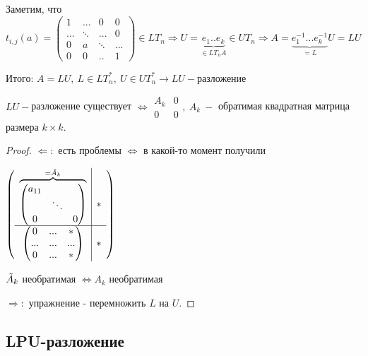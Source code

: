 Заметим, что $t_{i,j}(a)=\begin{pmatrix}
                             1 & ... & 0 & 0 \\
                             ... & \ddots & ... & 0 \\
                             0 & a & \ddots & ... \\
                             0 & 0 & ..& 1
\end{pmatrix}\in LT_n\Rightarrow U=\underbrace{e_1..e_k}_{\in LT_nA}\in UT_n\Rightarrow A = \underbrace{e_1^{-1}...e_k^{-1}}_{= L} U=LU$

Итого: $A=LU,\ L\in LT^*_n,\ U\in UT^*_n\rightarrow LU-$разложение

\begin{statement}
    $LU-$разложение существует $\Leftrightarrow\begin{array}{c|c}
                                                   A_k
                                                   & 0\\\hline 0 & 0\end{array},\ A_k\ -$ обратимая квадратная матрица размера $k\times k$.
\end{statement}

\begin{proof}
    $\Leftarrow:$ есть проблемы $\Leftrightarrow$ в какой-то момент получили

    $\left(\begin{array}{c|c}\overbrace{
        \begin{pmatrix}
            a_{11} & & \\
            & \ddots & \\
            0 && 0
        \end{pmatrix}}^{=\Tilde{A}_k}
    & *\\\hline \begin{pmatrix}
                    0 & ... & * \\
                    ... & ... & ... \\
                    0 & ... & *
    \end{pmatrix} & *\end{array}\right) $

    $ \Tilde{A}_k$ необратимая $\Leftrightarrow A_k$ необратимая

    $\Rightarrow:$ упражнение - перемножить $L$ на $U$.
\end{proof}

\subsection{LPU-разложение}

